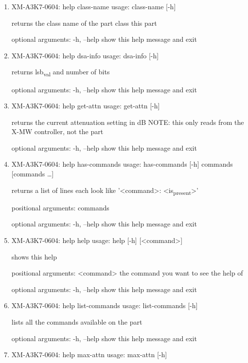 \documentclass[11pt]{article}
\begin{document}
\begin{enumerate}
\item XM-A3K7-0604: help class-name
\label{sec:org1de847b}
usage: class-name [-h]

returns the class name of the part class this part

optional arguments:
  -h, --help  show this help message and exit

\item XM-A3K7-0604: help dsa-info
\label{sec:orgaaa7c4d}
usage: dsa-info [-h]

returns lsb\textsubscript{val} and number of bits

optional arguments:
  -h, --help  show this help message and exit

\item XM-A3K7-0604: help get-attn
\label{sec:orgd3be43b}
usage: get-attn [-h]

returns the current attenuation setting in dB NOTE: this only reads from the
X-MW controller, not the part

optional arguments:
  -h, --help  show this help message and exit

\item XM-A3K7-0604: help has-commands
\label{sec:org391972d}
usage: has-commands [-h] commands [commands \ldots{}]

returns a list of lines each look like '<command>: <is\textsubscript{present}>'

positional arguments:
  commands

optional arguments:
  -h, --help  show this help message and exit

\item XM-A3K7-0604: help help
\label{sec:org856eda8}
usage: help [-h] [<command>]

shows this help

positional arguments:
  <command>   the command you want to see the help of

optional arguments:
  -h, --help  show this help message and exit

\item XM-A3K7-0604: help list-commands
\label{sec:org404e50c}
usage: list-commands [-h]

lists all the commands available on the part

optional arguments:
  -h, --help  show this help message and exit

\item XM-A3K7-0604: help max-attn
\label{sec:org012fa40}
usage: max-attn [-h]


\end{enumerate}
\end{document}

